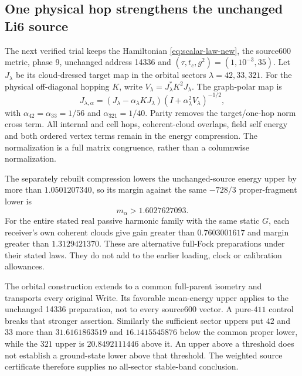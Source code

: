 \subsection{One physical hop strengthens the unchanged Li6 source}
\label{sec:li6-one-hop-12}

The next verified trial keeps the Hamiltonian
\eqref{eq:scalar-law-new}, the source600 metric, phase 9, unchanged address
14336 and $(\tau,t_c,g^2)=(1,10^{-3},35)$. Let $J_\lambda$ be its
cloud-dressed target map in the orbital sectors $\lambda=42,33,321$.
For the physical off-diagonal hopping $K$, write
$V_\lambda=J_\lambda^*K^2J_\lambda$. The graph-polar map is
\begin{equation}
 J_{\lambda,\alpha}
 =(J_\lambda-\alpha_\lambda KJ_\lambda)
       (I+\alpha_\lambda^2V_\lambda)^{-1/2},
\label{eq:one-hop-polar-12}
\end{equation}
with $\alpha_{42}=\alpha_{33}=1/56$ and $\alpha_{321}=1/40$.
Parity removes the target/one-hop norm cross term. All internal and cell
hops, coherent-cloud overlaps, field self energy and both ordered vertex
terms remain in the energy compression. The normalization is a full
matrix congruence, rather than a columnwise normalization.

The separately rebuilt compression lowers the unchanged-source energy
upper by more than $1.0501207340$, so its margin against the same
$-728/3$ proper-fragment lower is
\begin{equation}
 m_\alpha>1.6027627093.
\label{eq:li6-one-hop-margin-12}
\end{equation}
For the entire stated real passive harmonic family with the same static
$G$, each receiver's own coherent clouds give gain greater than
$0.7603001617$ and margin greater than $1.3129421370$. These are
alternative full-Fock preparations under their stated laws. They do not
add to the earlier loading, clock or calibration allowances.

The orbital construction extends to a common full-parent isometry and
transports every original Write. Its favorable mean-energy upper applies
to the unchanged 14336 preparation, not to every source600 vector. A
pure-$411$ control breaks that stronger assertion. Similarly the sufficient
sector uppers put $42$ and $33$ more than $31.6161863519$ and
$16.1415545876$ below the common proper lower, while the $321$ upper is
$20.8492111446$ above it. An upper above a threshold does not establish a
ground-state lower above that threshold. The weighted source certificate
therefore supplies no all-sector stable-band conclusion.

